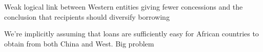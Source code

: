Weak logical link between Western entities giving fewer concessions and the conclusion that recipients should diversify borrowing

We're implicitly assuming that loans are sufficiently easy for African countries to obtain from both China and West. Big problem